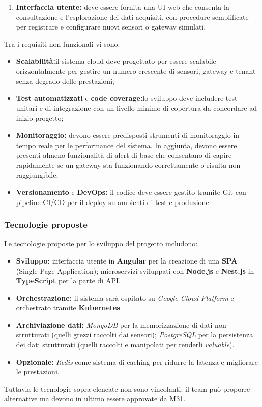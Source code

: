 \documentclass[a4paper,11pt]{article}
\begin{document}
\begin{enumerate}[noitemsep, topsep=0pt]
 \item \textbf{Interfaccia utente:} deve essere fornita una UI web che consenta la consultazione e l'esplorazione dei dati acquisiti, 
 con procedure semplificate per registrare e configurare nuovi sensori o gateway simulati.
\end{enumerate}
Tra i requisiti non funzionali vi sono: 
\begin{itemize}[noitemsep, topsep=0pt]
 \item \textbf{Scalabilità:}il sistema cloud deve progettato per essere scalabile orizzontalmente per gestire
un numero crescente di sensori, gateway e tenant senza degrado delle prestazioni;
 \item \textbf{Test automatizzati} e \textbf{code coverage:}lo sviluppo deve includere test unitari e di integrazione
con un livello minimo di copertura da concordare ad inizio progetto;
 \item \textbf{Monitoraggio:} devono essere predisposti strumenti di monitoraggio in tempo reale per le performance del sistema. 
 In aggiunta, devono essere presenti almeno funzionalità di alert di base che consentano di capire rapidamente 
 se un gateway sta funzionando correttamente o risulta non raggiungibile;
 \item \textbf{Versionamento} e \textbf{DevOps:} il codice deve essere gestito tramite Git con pipeline CI/CD 
 per il deploy su ambienti di test e produzione.
\end{itemize}

\subsubsection{Tecnologie proposte}
Le tecnologie proposte per lo sviluppo del progetto includono:
\begin{itemize}[noitemsep, topsep=0pt]
 \item \textbf{Sviluppo:} 
 interfaccia utente in \textbf{Angular} per la creazione di una \textbf{SPA} (Single Page Application); 
 microservizi sviluppati con \textbf{Node.js} e \textbf{Nest.js} in \textbf{TypeScript} per la parte di API.
 
 \item \textbf{Orchestrazione:} 
 il sistema sarà ospitato su \textit{Google Cloud Platform} e orchestrato tramite \textbf{Kubernetes}.
 
 \item \textbf{Archiviazione dati:} 
 \textit{MongoDB} per la memorizzazione di dati non strutturati (quelli grezzi raccolti dai sensori); 
 \textit{PostgreSQL} per la persistenza dei dati strutturati (quelli raccolti e manipolati per renderli \textit{valuable}).
 
 \item \textbf{Opzionale:} 
 \textit{Redis} come sistema di caching per ridurre la latenza e migliorare le prestazioni.
\end{itemize}
Tuttavia le tecnologie sopra elencate non sono vincolanti: il team può proporre alternative ma devono in ultimo essere approvate da M31.
\end{document}
